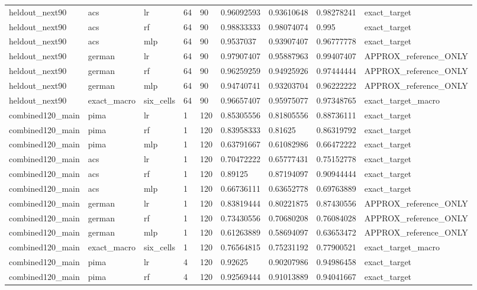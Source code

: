 \begin{tabular}{lllllllll}
heldout\_next90 & acs & lr & 64 & 90 & 0.96092593 & 0.93610648 & 0.98278241 & exact\_target \\
heldout\_next90 & acs & rf & 64 & 90 & 0.98833333 & 0.98074074 & 0.995 & exact\_target \\
heldout\_next90 & acs & mlp & 64 & 90 & 0.9537037 & 0.93907407 & 0.96777778 & exact\_target \\
heldout\_next90 & german & lr & 64 & 90 & 0.97907407 & 0.95887963 & 0.99407407 & APPROX\_reference\_ONLY \\
heldout\_next90 & german & rf & 64 & 90 & 0.96259259 & 0.94925926 & 0.97444444 & APPROX\_reference\_ONLY \\
heldout\_next90 & german & mlp & 64 & 90 & 0.94740741 & 0.93203704 & 0.96222222 & APPROX\_reference\_ONLY \\
heldout\_next90 & exact\_macro & six\_cells & 64 & 90 & 0.96657407 & 0.95975077 & 0.97348765 & exact\_target\_macro \\
combined120\_main & pima & lr & 1 & 120 & 0.85305556 & 0.81805556 & 0.88736111 & exact\_target \\
combined120\_main & pima & rf & 1 & 120 & 0.83958333 & 0.81625 & 0.86319792 & exact\_target \\
combined120\_main & pima & mlp & 1 & 120 & 0.63791667 & 0.61082986 & 0.66472222 & exact\_target \\
combined120\_main & acs & lr & 1 & 120 & 0.70472222 & 0.65777431 & 0.75152778 & exact\_target \\
combined120\_main & acs & rf & 1 & 120 & 0.89125 & 0.87194097 & 0.90944444 & exact\_target \\
combined120\_main & acs & mlp & 1 & 120 & 0.66736111 & 0.63652778 & 0.69763889 & exact\_target \\
combined120\_main & german & lr & 1 & 120 & 0.83819444 & 0.80221875 & 0.87430556 & APPROX\_reference\_ONLY \\
combined120\_main & german & rf & 1 & 120 & 0.73430556 & 0.70680208 & 0.76084028 & APPROX\_reference\_ONLY \\
combined120\_main & german & mlp & 1 & 120 & 0.61263889 & 0.58694097 & 0.63653472 & APPROX\_reference\_ONLY \\
combined120\_main & exact\_macro & six\_cells & 1 & 120 & 0.76564815 & 0.75231192 & 0.77900521 & exact\_target\_macro \\
combined120\_main & pima & lr & 4 & 120 & 0.92625 & 0.90207986 & 0.94986458 & exact\_target \\
combined120\_main & pima & rf & 4 & 120 & 0.92569444 & 0.91013889 & 0.94041667 & exact\_target \\

\end{tabular}
